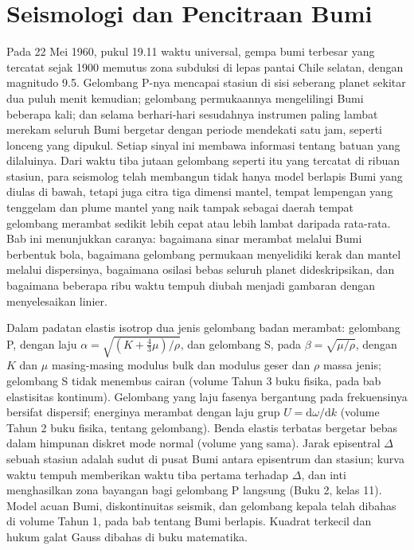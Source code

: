 \chapter{Seismologi dan Pencitraan Bumi}\label{ch:b3:seismology-imaging}

Pada 22 Mei 1960, pukul 19.11 waktu universal, gempa bumi terbesar yang tercatat sejak
1900 memutus zona subduksi di lepas pantai Chile selatan, dengan magnitudo 9.5.
Gelombang P-nya mencapai stasiun di sisi seberang planet sekitar dua puluh menit
kemudian; gelombang permukaannya mengelilingi Bumi beberapa kali; dan selama berhari-hari
sesudahnya instrumen paling lambat merekam seluruh Bumi bergetar dengan
periode mendekati satu jam, seperti lonceng yang dipukul. Setiap sinyal ini membawa
informasi tentang batuan yang dilaluinya. Dari waktu tiba jutaan
gelombang seperti itu yang tercatat di ribuan stasiun, para seismolog telah membangun tidak hanya
model berlapis Bumi yang diulas di bawah, tetapi juga citra tiga dimensi
mantel, tempat lempengan yang tenggelam dan plume mantel yang naik tampak sebagai daerah
tempat gelombang merambat sedikit lebih cepat atau lebih lambat daripada rata-rata. Bab ini menunjukkan caranya:
bagaimana sinar merambat melalui Bumi berbentuk bola, bagaimana gelombang permukaan
menyelidiki kerak dan mantel melalui dispersinya, bagaimana osilasi bebas seluruh
planet dideskripsikan, dan bagaimana beberapa ribu waktu tempuh diubah menjadi
gambaran dengan menyelesaikan  linier.

\begin{recall}
Dalam padatan elastis isotrop dua jenis gelombang badan merambat: gelombang P, dengan
laju $\alpha = \sqrt{(K + \tfrac43\mu)/\rho}$, dan gelombang S, pada
$\beta = \sqrt{\mu/\rho}$, dengan $K$ dan $\mu$ masing-masing modulus bulk dan modulus geser
dan $\rho$ massa jenis; gelombang S tidak menembus cairan (volume Tahun 3 buku fisika,
pada bab elastisitas kontinum). Gelombang yang laju fasenya bergantung
pada frekuensinya bersifat dispersif; energinya merambat dengan laju
grup $U = \mathrm d\omega/\mathrm dk$ (volume Tahun 2 buku fisika, tentang
gelombang). Benda elastis terbatas bergetar bebas dalam himpunan diskret mode normal
(volume yang sama). Jarak episentral $\Delta$ sebuah stasiun adalah sudut
di pusat Bumi antara episentrum dan stasiun; kurva waktu tempuh
memberikan waktu tiba pertama terhadap $\Delta$, dan inti menghasilkan
zona bayangan bagi gelombang P langsung (Buku 2, kelas 11). Model acuan Bumi,
diskontinuitas seismik, dan gelombang kepala telah dibahas di volume Tahun 1,
pada bab tentang Bumi berlapis. Kuadrat terkecil dan hukum galat Gauss
dibahas di buku matematika.
\end{recall}

